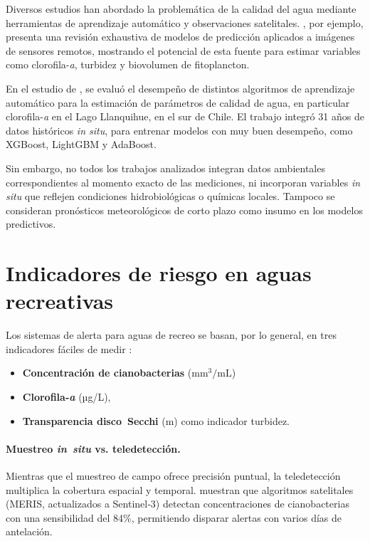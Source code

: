 \documentclass[11pt]{report}
\begin{document}
Diversos estudios han abordado la problemática de la calidad del agua mediante herramientas de aprendizaje automático y observaciones satelitales. \citep{Schaeffer2024}, por ejemplo, presenta una revisión exhaustiva de modelos de predicción aplicados a imágenes de sensores remotos, mostrando el potencial de esta fuente para estimar variables como clorofila-\emph{a}, turbidez y biovolumen de fitoplancton. 

En el estudio de \cite{RodriguezLopez2023}, se evaluó el desempeño de distintos algoritmos de aprendizaje automático para la estimación de parámetros de calidad de agua, en particular clorofila-\emph{a} en el Lago Llanquihue, en el sur de Chile. El trabajo integró 31 años de datos históricos \textit{in situ}, para entrenar modelos con muy buen desempeño, como XGBoost, LightGBM y AdaBoost.

Sin embargo, no todos los trabajos analizados integran datos ambientales correspondientes al momento exacto de las mediciones, ni incorporan variables \textit{in situ} que reflejen condiciones hidrobiológicas o químicas locales. Tampoco se consideran pronósticos meteorológicos de corto plazo como insumo en los modelos predictivos.

\section{Indicadores de riesgo en aguas recreativas}

Los sistemas de alerta para aguas de recreo se basan, por lo general,
en tres indicadores fáciles de medir \citep{WHO2021}:

\begin{itemize}[noitemsep]
  \item \textbf{Concentración de cianobacterias} ($\mathrm{mm^3}/\mathrm{mL}$)
  \item \textbf{Clorofila‑\emph{a}} (µg/L),
  \item \textbf{Transparencia disco Secchi} (m) como indicador turbidez.
\end{itemize}

\paragraph{Muestreo \textit{in situ} vs. teledetección.}
Mientras que el muestreo de campo ofrece precisión puntual, la
teledetección multiplica la cobertura espacial y temporal.
\citep{Stumpf2016} muestran que algoritmos satelitales (MERIS,
actualizados a Sentinel‑3) detectan concentraciones de cianobacterias
con una sensibilidad del 84\%, permitiendo disparar alertas con varios
días de antelación.
\end{document}
